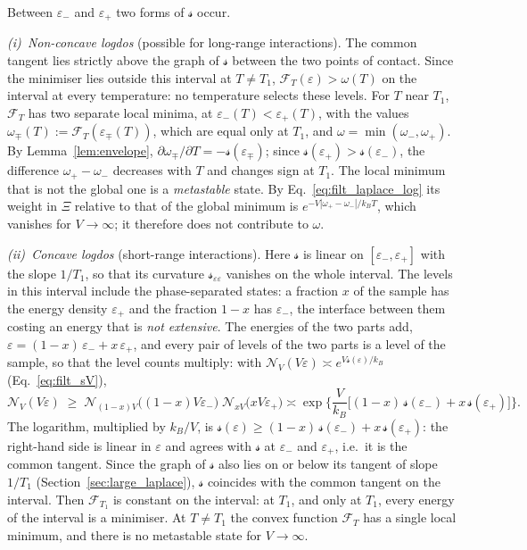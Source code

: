 \documentclass[10pt,a4paper]{article}
\theoremstyle{plain}
\newcommand{\cN}{\mathcal{N}}   %
\newcommand{\lndos}{{logdos}}  %
\newcommand{\Fen}[1][T]{\mathscr{F}_{#1}}  %
\newcommand{\lds}{\mathscr{s}}  %
\begin{document}
Between $\varepsilon_-$ and $\varepsilon_+$ two forms of $\lds$ occur.

\emph{(i)~Non-concave \lndos{}} (possible for long-range interactions). The
common tangent lies strictly above the graph of $\lds$ between the two
points of contact. Since the minimiser lies outside this interval at
$T\neq T_1$, $\Fen(\varepsilon)>\omega(T)$ on the interval at every
temperature: no temperature selects these levels. For $T$ near $T_1$,
$\Fen$ has two separate local minima, at
$\varepsilon_-(T)<\varepsilon_+(T)$, with the values
$\omega_\mp(T):=\Fen(\varepsilon_\mp(T))$, which are equal only at $T_1$, and
$\omega=\min(\omega_-,\omega_+)$. By Lemma~\ref{lem:envelope},
$\partial\omega_\mp/\partial T=-\lds(\varepsilon_\mp)$; since
$\lds(\varepsilon_+)>\lds(\varepsilon_-)$, the difference $\omega_+-\omega_-$
decreases with $T$ and changes sign at $T_1$. The local minimum that is not
the global one is a \emph{metastable} state. By
Eq.~\eqref{eq:filt_laplace_log} its weight in $\Xi$ relative to that of the
global minimum is $e^{-V|\omega_+-\omega_-|/k_BT}$, which vanishes for
$V\to\infty$; it therefore does not contribute to $\omega$.

\emph{(ii)~Concave \lndos{}} (short-range interactions). Here $\lds$ is
linear on $[\varepsilon_-,\varepsilon_+]$ with the slope $1/T_1$, so that
its curvature $\lds_{\varepsilon\varepsilon}$ vanishes on the whole interval.
The levels in this interval include the phase-separated states: a fraction
$x$ of the sample has the energy density $\varepsilon_+$ and the fraction
$1-x$ has $\varepsilon_-$, the interface between them costing an energy that
is \emph{not extensive}. The energies of the two parts add,
$\varepsilon=(1-x)\,\varepsilon_-+x\,\varepsilon_+$, and every pair of levels
of the two parts is a level of the sample, so that the level counts multiply:
with $\cN_V(V\varepsilon)\asymp e^{V\lds(\varepsilon)/k_B}$
(Eq.~\eqref{eq:filt_sV}),
\[
  \cN_V(V\varepsilon)\;\ge\;
  \cN_{(1-x)V}\big((1-x)V\varepsilon_-\big)\;\cN_{xV}\big(xV\varepsilon_+\big)
  \asymp\exp\Big\{\frac{V}{k_B}\big[(1-x)\,\lds(\varepsilon_-)+x\,\lds(\varepsilon_+)\big]\Big\} .
\]
The logarithm, multiplied by $k_B/V$, is
$\lds(\varepsilon)\ge(1-x)\,\lds(\varepsilon_-)+x\,\lds(\varepsilon_+)$: the
right-hand side is linear in $\varepsilon$ and agrees with $\lds$ at
$\varepsilon_-$ and $\varepsilon_+$, i.e.\ it is the common tangent. Since
the graph of $\lds$ also lies on or below its tangent of slope $1/T_1$
(Section~\ref{sec:large_laplace}), $\lds$ coincides with the common tangent
on the interval. Then
$\Fen[T_1]$ is constant on the interval: at $T_1$, and only at $T_1$, every
energy of the interval is a minimiser. At $T\neq T_1$ the convex function
$\Fen$ has a single local minimum, and there is no metastable state for
$V\to\infty$.
\end{document}
